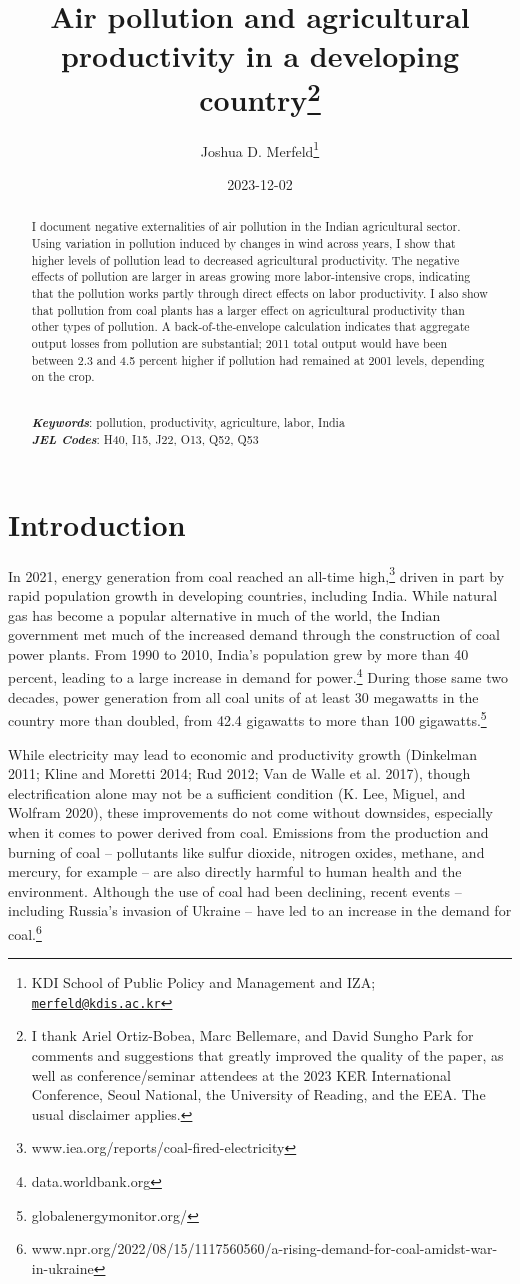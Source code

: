 \documentclass[
]{article}
\title{Air pollution and agricultural productivity in a developing country\footnote{I thank Ariel Ortiz-Bobea, Marc Bellemare, and David Sungho Park for comments and suggestions that greatly improved the quality of the paper, as well as conference/seminar attendees at the 2023 KER International Conference, Seoul National, the University of Reading, and the EEA. The usual disclaimer applies.}}
\author{Joshua D. Merfeld\footnote{KDI School of Public Policy and Management and IZA; \href{mailto:merfeld@kdis.ac.kr}{\nolinkurl{merfeld@kdis.ac.kr}}}}
\date{2023-12-02}
\begin{document}
\maketitle
\begin{abstract}
\noindent I document negative externalities of air pollution in the Indian agricultural sector. Using variation in pollution induced by changes in wind across years, I show that higher levels of pollution lead to decreased agricultural productivity. The negative effects of pollution are larger in areas growing more labor-intensive crops, indicating that the pollution works partly through direct effects on labor productivity. I also show that pollution from coal plants has a larger effect on agricultural productivity than other types of pollution. A back-of-the-envelope calculation indicates that aggregate output losses from pollution are substantial; 2011 total output would have been between 2.3 and 4.5 percent higher if pollution had remained at 2001 levels, depending on the crop.\\
\strut \\
\textbf{\textit{Keywords}}: pollution, productivity, agriculture, labor, India\\
\textbf{\textit{JEL Codes}}: H40, I15, J22, O13, Q52, Q53
\end{abstract}

\newpage
\doublespacing

\hypertarget{introduction}{%
\section{Introduction}\label{introduction}}

In 2021, energy generation from coal reached an all-time high,\footnote{www.iea.org/reports/coal-fired-electricity} driven in part by rapid population growth in developing countries, including India. While natural gas has become a popular alternative in much of the world, the Indian government met much of the increased demand through the construction of coal power plants. From 1990 to 2010, India's population grew by more than 40 percent, leading to a large increase in demand for power.\footnote{data.worldbank.org} During those same two decades, power generation from all coal units of at least 30 megawatts in the country more than doubled, from 42.4 gigawatts to more than 100 gigawatts.\footnote{globalenergymonitor.org/}

While electricity may lead to economic and productivity growth (Dinkelman 2011; Kline and Moretti 2014; Rud 2012; Van de Walle et al. 2017), though electrification alone may not be a sufficient condition (K. Lee, Miguel, and Wolfram 2020), these improvements do not come without downsides, especially when it comes to power derived from coal. Emissions from the production and burning of coal -- pollutants like sulfur dioxide, nitrogen oxides, methane, and mercury, for example -- are also directly harmful to human health and the environment. Although the use of coal had been declining, recent events -- including Russia's invasion of Ukraine -- have led to an increase in the demand for coal.\footnote{www.npr.org/2022/08/15/1117560560/a-rising-demand-for-coal-amidst-war-in-ukraine}
\end{document}
